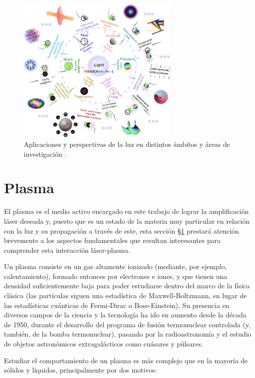 \begin{figure}[htbp]
  \centering
  \includegraphics[width=0.7\textwidth]{Figuras/ch1_app_oam.png}
  \caption{Aplicaciones y perspectivas de la luz en distintos ámbitos y áreas de investigación \autocite{He2022}.}
  \label{fig:1.16}
\end{figure}

\section{Plasma}\label{sec:1.2}
El plasma es el medio activo encargado en este trabajo de lograr la amplificación láser deseada y, puesto que es un estado de la materia muy particular en relación con la luz y su propagación a través de este, esta sección \S\ref{sec:1.2} prestará atención brevemente a los aspectos fundamentales que resultan interesantes para comprender esta interacción láser-plasma. 

Un plasma consiste en un gas altamente ionizado (mediante, por ejemplo, calentamiento), formado entonces por electrones e iones, y que tienen una densidad suficientemente baja para poder estudiarse dentro del marco de la física clásica (las partículas siguen una estadística de Maxwell-Boltzmann, en lugar de las estadísticas cuánticas de Fermi-Dirac o Bose-Einstein)\autocite{Thorne2017}. Su presencia en diversos campos de la ciencia y la tecnología ha ido en aumento desde la década de 1950, durante el desarrollo del programa de fusión termonuclear controlada (y, también, de la bomba termonuclear), pasando por la radioastronomía y el estudio de objetos astronómicos extragalácticos como cuásares y púlsares.

Estudiar el comportamiento de un plasma es más complejo que en la mayoría de sólidos y líquidos, principalmente por dos motivos:

